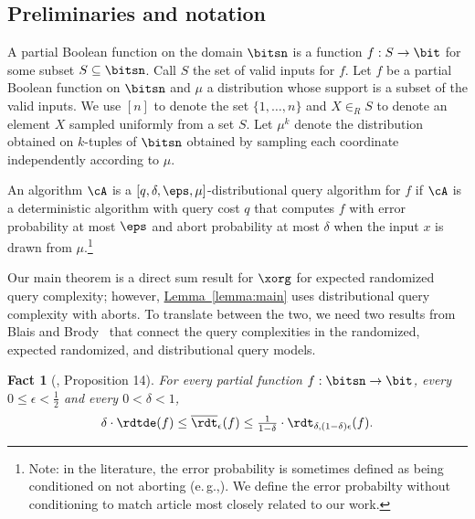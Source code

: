 \documentclass[11pt]{article}
\numberwithin{equation}{section}
\newtheorem{fact}[theorem]{Fact}
\theoremstyle{definition}
\theoremstyle{plain}
\newcommand{\eg}{e.\,g.}
\newcommand{\expref}[2]{\hyperref[#2]{#1~\ref{#2}}}
\begin{document}
%
\subsection{Preliminaries and notation}   %

A partial Boolean function on the domain $\bitsn$ is a function
$f: S \rightarrow \bit$ for some subset $S \subseteq \bitsn$.  Call
$S$ the set of valid inputs for $f$.  Let $f$ be a partial Boolean
function on $\bitsn$ and $\mu$ a distribution whose support is a
subset of the valid inputs. %
%
%
%
%
%
%
%
%
%
%
We use $[n]$ to denote the set
$\{1,\ldots, n\}$ and $X \in_R S$ to denote an element $X$ sampled uniformly
from a set $S$.  Let $\mu^k$ denote the distribution obtained on
$k$-tuples of $\bitsn$ obtained by sampling each coordinate
independently according to $\mu$.

An algorithm $\cA$ is a $[q,\delta,\eps,\mu]$-distributional query
algorithm for $f$ if $\cA$ is a deterministic algorithm with query
cost $q$ that computes $f$ with error probability at most $\eps$ and
abort probability at most $\delta$ when the input $x$ is drawn from
$\mu$.\footnote{Note: in the literature, the error probability is
  sometimes defined as being conditioned on not aborting 
(\eg,\cite{BenDavidGKW20}).  We define
  the error probabilty without conditioning to match
%
article \cite{BlaisB19}   %
most closely related to our work.}

Our main theorem is a direct sum result for $\xorg$ for %
expected %
randomized query complexity; however, \expref{Lemma}{lemma:main} uses
distributional query complexity with aborts.  To translate between the
two, we need two results from Blais and Brody~\cite{BlaisB19} that
connect the query complexities in the randomized, %
expected %
randomized, and distributional query models.

\begin{fact}[\cite{BlaisB19}, Proposition 14]
\label{fact:abort-average}
For every
partial %
function $f : \bitsn \to \bit$, every
$0 \le \epsilon < \frac12$ and every $0 < \delta < 1$,
\[
\delta \cdot \rdtde(f) \le \overline{\rdt}_\epsilon(f) \le \tfrac{1}{1-\delta}
\cdot \rdt_{\delta,(1-\delta)\epsilon}(f).
%
%
\]
\end{fact}
\end{document}
